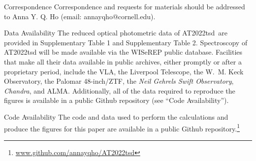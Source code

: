 \documentclass{nature_plusfigure}
\newcommand{\at}{AT2022tsd}
\begin{document}
\begin{addendum}
 \item[Correspondence] Correspondence and requests for materials
should be addressed to Anna Y. Q. Ho (email: annayqho@cornell.edu).

 \item[Data Availability] The reduced optical photometric data of \at\ are provided in Supplementary Table 1 and Supplementary Table 2. Spectroscopy of AT2022tsd will be made available via the WISeREP public database. Facilities that make all their data available in public archives, either promptly or after a proprietary period, include the VLA, the Liverpool Telescope, the W.~M. Keck Observatory, the Palomar 48-inch/ZTF,  the {\it Neil Gehrels Swift Observatory}, \emph{Chandra}, and ALMA. Additionally, all of the data required to reproduce the figures is available in a public Github repository (see ``Code Availability'').
 
 \item[Code Availability] The code and data used to perform the calculations and produce the figures for this paper are available in a public Github repository.\footnote{\url{www.github.com/annayqho/AT2022tsd}}

\end{addendum}
\end{document}
